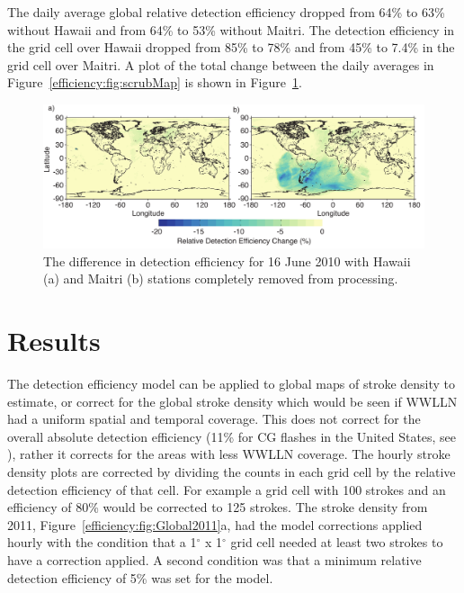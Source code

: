 The daily average global relative detection efficiency dropped from 64\% to 63\% without Hawaii and from 64\% to 53\% without Maitri.
The detection efficiency in the grid cell over Hawaii dropped from 85\% to 78\% and from 45\% to 7.4\% in the grid cell over Maitri.
A plot of the total change between the daily averages in Figure~\ref{efficiency:fig:scrubMap} is shown in Figure~\ref{efficiency:fig:scrub}.

\begin{figure}[ht!]
   \centering
\noindent\includegraphics[scale=0.8]{efficiency/Figures/2012RS005049-p13.pdf}
\caption{The difference in detection efficiency for 16 June 2010 with Hawaii (a) and Maitri (b) stations completely removed from processing.}
\label{efficiency:fig:scrub}
\end{figure}

\section{Results}

The detection efficiency model can be applied to global maps of stroke density to estimate, or correct for the global stroke density which would be seen if WWLLN had a uniform spatial and temporal coverage.
This does not correct for the overall absolute detection efficiency (11\% for CG flashes in the United States, see \citet{Abarca2010}), rather it corrects for the areas with less WWLLN coverage.
The hourly stroke density plots are corrected by dividing the counts in each grid cell by the relative detection efficiency of that cell.
For example a grid cell with 100 strokes and an efficiency of 80\% would be corrected to 125 strokes.
The stroke density from 2011, Figure~\ref{efficiency:fig:Global2011}a, had the model corrections applied hourly with the condition that a 1$^\circ$ x 1$^\circ$ grid cell needed at least two strokes to have a correction applied.
A second condition was that a minimum relative detection efficiency of 5\% was set for the model.


